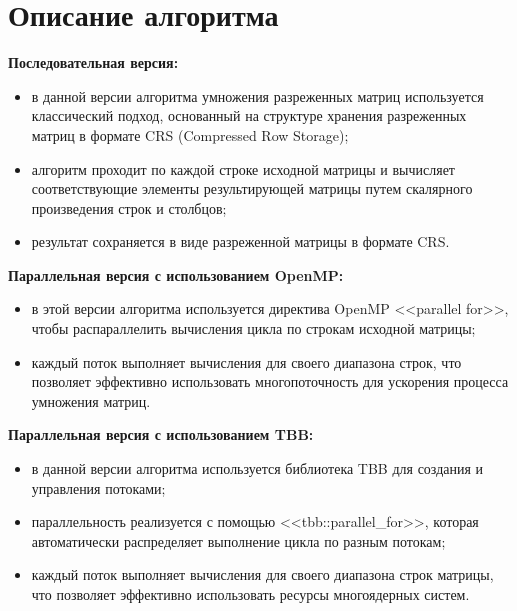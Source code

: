 \documentclass[a4paper, 14pt]{article}
\begin{document}
	
	\newpage
	\section*{\centering Описание алгоритма}
	\textbf{Последовательная версия:}
	\vspace{-1em}
	\begin{itemize}[leftmargin=3em]
		\setlength\itemsep{0cm}
		\item в данной версии алгоритма умножения разреженных матриц используется классический подход, основанный на структуре хранения разреженных матриц в формате CRS (Compressed Row Storage);
		\item алгоритм проходит по каждой строке исходной матрицы и вычисляет соответствующие элементы результирующей матрицы путем скалярного произведения строк и столбцов;
		\item результат сохраняется в виде разреженной матрицы в формате CRS.
	\end{itemize}
	
	\textbf{Параллельная версия с использованием OpenMP:}
	\vspace{-1em}
	\begin{itemize}[leftmargin=3em]
		\setlength\itemsep{0cm}
		\item в этой версии алгоритма используется директива OpenMP <<parallel for>>, чтобы распараллелить вычисления цикла по строкам исходной матрицы;
		\item каждый поток выполняет вычисления для своего диапазона строк, что позволяет эффективно использовать многопоточность для ускорения процесса умножения матриц.
	\end{itemize}
	
	\textbf{Параллельная версия с использованием TBB:}
	\vspace{-1em}
	\begin{itemize}[leftmargin=3em]
		\setlength\itemsep{0cm}
		\item в данной версии алгоритма используется библиотека TBB для создания и управления потоками;
		\item параллельность реализуется с помощью <<tbb::parallel\_for>>, которая автоматически распределяет выполнение цикла по разным потокам;
		\item каждый поток выполняет вычисления для своего диапазона строк матрицы, что позволяет эффективно использовать ресурсы многоядерных систем.
	\end{itemize}
	
\end{document}
